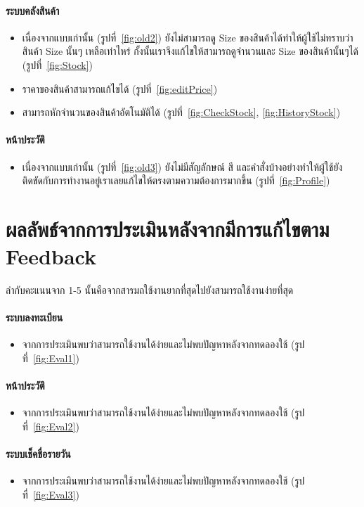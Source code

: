 \paragraph{ระบบคลังสินค้า}
\begin{itemize}
    \item เนื่องจากแบบเก่านั้น (รูปที่~\ref{fig:old2}) ยังไม่สามารถดู Size ของสินค้าได้ทำให้ผู้ใช้ไม่ทราบว่าสินค้า Size นั้นๆ เหลือเท่าไหร่ กั้งนั้นเราจึงแก้ไขให้สามารถดูจำนวนและ Size ของสินค้านั้นๆได้ (รูปที่~\ref{fig:Stock})
    \item ราคาของสินค้าสามารถแก้ไขได้ (รูปที่~\ref{fig:editPrice})
    \item สามารถหักจำนวนของสินค้าอัตโนมัติได้ (รูปที่~\ref{fig:CheckStock}, \ref{fig:HistoryStock})
\end{itemize}
\paragraph{หน้าประวัติ}
\begin{itemize}
    \item เนื่องจากแบบเก่านั้น (รูปที่~\ref{fig:old3}) ยังไม่มีสัญลักษณ์ สี และคำสั่งบ้างอย่างทำให้ผู้ใช้ยังติดขัดกับการทำงานอยู่เราเลยแก้ไขให้ตรงตามความต้องการมากขึ้น (รูปที่~\ref{fig:Profile})
\end{itemize}

\section{ผลลัพธ์จากการประเมินหลังจากมีการแก้ไขตาม Feedback}
ลำกับคะแนนจาก 1-5 นั้นคือจากสารมถใช้งานยากที่สุดไปยังสามารถใช้งานง่ายที่สุด
\paragraph{ระบบลงทะเบียน}
\begin{itemize}
  \item จากการประเมินพบว่าสามารถใช้งานได้ง่ายและไม่พบปัญหาหลังจากทดลองใช้ (รูปที่~\ref{fig:Eval1})
\end{itemize}
\paragraph{หน้าประวัติ}
\begin{itemize}
  \item จากการประเมินพบว่าสามารถใช้งานได้ง่ายและไม่พบปัญหาหลังจากทดลองใช้ (รูปที่~\ref{fig:Eval2})
\end{itemize}
\paragraph{ระบบเช็คชื่อรายวัน}
\begin{itemize}
  \item จากการประเมินพบว่าสามารถใช้งานได้ง่ายและไม่พบปัญหาหลังจากทดลองใช้ (รูปที่~\ref{fig:Eval3})
\end{itemize}
